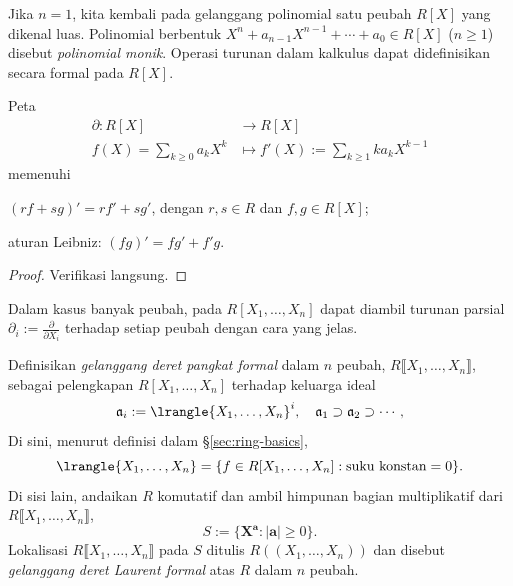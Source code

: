 Jika $n=1$, kita kembali pada gelanggang polinomial satu peubah $R[X]$ yang dikenal luas. Polinomial berbentuk $X^n + a_{n-1} X^{n-1} + \cdots + a_0 \in R[X]$ ($n \geq 1$) disebut \emph{polinomial monik}. Operasi turunan dalam kalkulus dapat didefinisikan secara formal pada $R[X]$. 
\begin{proposition}\label{prop:polynomial-derivation}
	Peta
	\begin{align*}
		\partial: R[X] & \longrightarrow R[X] \\
		f(X) = \sum_{k \geq 0} a_k X^k & \longmapsto f'(X) := \sum_{k \geq 1} k a_k X^{k-1}
	\end{align*}
	memenuhi
	\begin{compactitem}
		\item $(rf + sg)' = rf' + sg'$, dengan $r, s \in R$ dan $f, g \in R[X]$;
		\item aturan Leibniz: $(fg)' = fg' + f'g$.
	\end{compactitem}
\end{proposition}
\begin{proof}
	Verifikasi langsung.
\end{proof}
Dalam kasus banyak peubah, pada $R[X_1, \ldots, X_n]$ dapat diambil turunan parsial $\partial_i := \frac{\partial}{\partial X_i}$ terhadap setiap peubah dengan cara yang jelas.

\begin{definition}\label{def:formal-series}  
	Definisikan \emph{gelanggang deret pangkat formal} dalam $n$ peubah, $R \llbracket X_1, \ldots, X_n \rrbracket$, sebagai pelengkapan $R[X_1, \ldots, X_n]$ terhadap keluarga ideal
	\begin{gather*}
		\mathfrak{a}_i := \lrangle{X_1, \ldots, X_n}^i, \quad \mathfrak{a}_1 \supset \mathfrak{a}_2 \supset \cdots,
	\end{gather*}
    Di sini, menurut definisi dalam \S\ref{sec:ring-basics},
    \[ \lrangle{X_1, \ldots, X_n} = \{f \in R[X_1, \ldots, X_n] : \text{suku konstan}=0\}. \]
	Di sisi lain, andaikan $R$ komutatif dan ambil himpunan bagian multiplikatif dari $R\llbracket X_1, \ldots, X_n\rrbracket$,
	\[ S := \{\bm{X}^{\bm{a}} : |\bm{a}| \geq 0 \}. \]
	Lokalisasi $R\llbracket X_1, \ldots, X_n \rrbracket$ pada $S$ ditulis $R(\!(X_1, \ldots, X_n)\!)$ dan disebut \emph{gelanggang deret Laurent formal} atas $R$ dalam $n$ peubah.
\end{definition}

